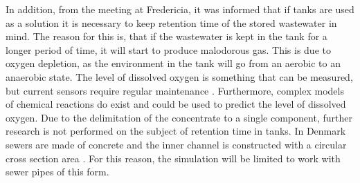 In addition, from the meeting at Fredericia, it was informed that if tanks are used as a solution it is necessary to keep retention time of the stored wastewater in mind. The reason for this is, that if the wastewater is kept in the tank for a longer period of time, it will start to produce malodorous gas. This is due to oxygen depletion, as the environment in the tank will go from an aerobic to an anaerobic state. The level of dissolved oxygen is something that can be measured, but current sensors require regular maintenance \cite{dissolved_oxygen_measuring}. 
Furthermore, complex models of chemical reactions do exist and could be used to predict the level of dissolved oxygen.   
Due to the delimitation of the concentrate to a single component, further research is not performed on the subject of retention time in tanks.
In Denmark sewers are made of concrete and the inner channel is constructed with a circular cross section area \cite{betonhaandbogen}. For this reason, the simulation will be limited to work with sewer pipes of this form.



